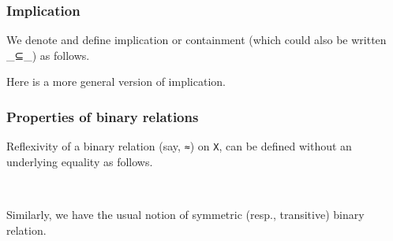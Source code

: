 \documentclass[sigplan,screen]{acmart}
\begin{document}
\subsubsection{Implication}\label{implication}
We denote and define implication or containment (which could also be
written \_⊆\_) as follows.
\begin{code}\end{code}
Here is a more general version of implication.
\begin{code}\end{code}

\subsubsection{Properties of binary relations}\label{properties-of-binary-relations}

Reflexivity of a binary relation (say, \texttt{≈}) on \texttt{X}, can be
defined without an underlying equality as follows.

\begin{code}
\>[0]\AgdaSpace{}%
\AgdaSymbol{:}\AgdaSpace{}%
\AgdaSymbol{\{}\AgdaSpace{}%
\AgdaSymbol{:}\AgdaSpace{}%
\AgdaSpace{}%
\AgdaSpace{}%
\AgdaSymbol{\}}\AgdaSpace{}%
\AgdaSpace{}%
\AgdaSpace{}%
\AgdaSpace{}%
\AgdaSpace{}%
\AgdaSpace{}%
\AgdaSpace{}%
\AgdaSpace{}%
\AgdaSpace{}%
\<%
\\
\>[0]\AgdaSpace{}%
\AgdaSpace{}%
\AgdaSymbol{=}\AgdaSpace{}%
\AgdaSpace{}%
\AgdaSpace{}%
\AgdaSpace{}%
\AgdaSpace{}%
\AgdaSpace{}%
\<%
\end{code}

Similarly, we have the usual notion of symmetric (resp., transitive) binary relation.
\end{document}
